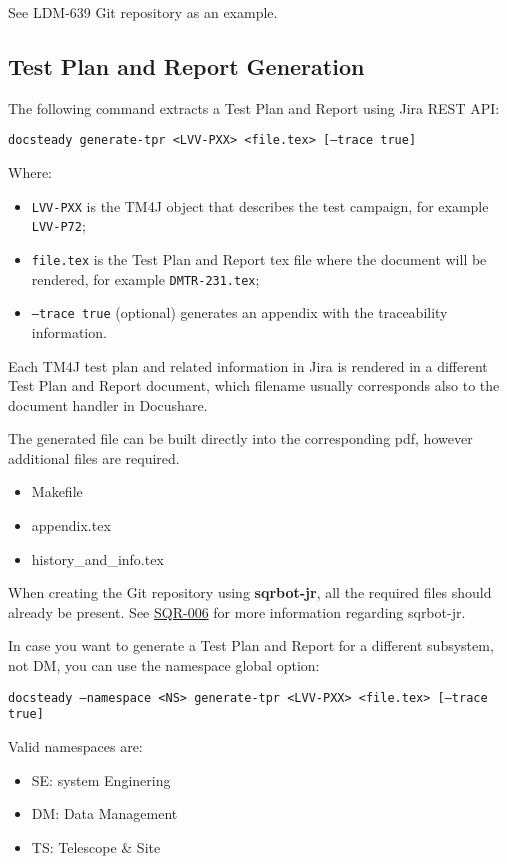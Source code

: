 \documentclass[DM]{lsstdoc}
\begin{document}
See LDM-639 Git repository as an example.


\subsection{Test Plan and Report Generation}

The following command extracts a Test Plan and Report using Jira REST API:

\texttt{docsteady generate-tpr <LVV-PXX> <file.tex> [--trace true]}

Where:

\begin{itemize}
\item \texttt{LVV-PXX} is the TM4J object that describes the test campaign, for example \texttt{LVV-P72};
\item \texttt{file.tex} is the Test Plan and Report tex file where the document will be rendered, for example \texttt{DMTR-231.tex};
\item \texttt{--trace true} (optional) generates an appendix with the traceability information.
\end{itemize}

Each TM4J test plan and related information in Jira is rendered in a different Test Plan and Report document,
which filename usually corresponds also to the document handler in Docushare.

The generated file can be built directly into the corresponding pdf, however additional files are required.

\begin{itemize}
\item Makefile
\item appendix.tex
\item history\_and\_info.tex
\end{itemize}

When creating the Git repository using \textbf{sqrbot-jr}, all the required files should already be present.
See \href{https://sqr-006.lsst.io/}{SQR-006} for more information regarding sqrbot-jr.

In case you want to generate a Test Plan and Report for a different subsystem, not DM, you can use the namespace global option:

\texttt{docsteady --namespace <NS> generate-tpr <LVV-PXX> <file.tex> [--trace true]}

Valid namespaces are:

\begin{itemize}
\item SE: system Enginering
\item DM: Data Management
\item TS: Telescope \& Site
\end{itemize}
\end{document}
